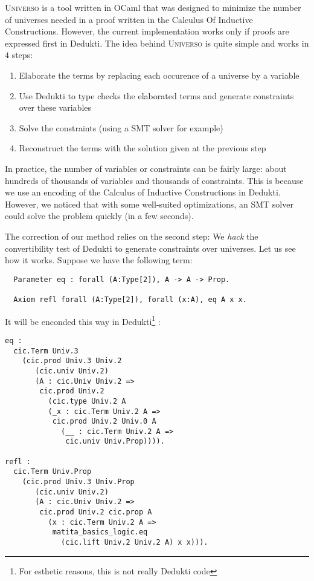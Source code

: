 \documentclass[conference]{IEEEtran}
\newcommand{\universo}{\textsc{Universo}}
\begin{document}
\universo{} is a tool written in OCaml that was designed to minimize the number of universes needed in a proof written in the Calculus Of Inductive Constructions. However, the current implementation works only if proofs are expressed first in Dedukti. The idea behind \universo{} is quite simple and works in \(4\) steps:
\begin{enumerate}
\item Elaborate the terms by replacing each occurence of a universe by a variable
\item Use Dedukti to type checks the elaborated terms and generate constraints over these variables
\item Solve the constraints (using a SMT solver for example)
\item Reconstruct the terms with the solution given at the previous step
\end{enumerate}

In practice, the number of variables or constraints can be fairly large: about hundreds of thousands of variables and thousands of constraints. This is because we use an encoding of the Calculus of Inductive Constructions in Dedukti. However, we noticed that with some well-suited optimizations, an SMT solver could solve the problem quickly (in a few seconds).

The correction of our method relies on the second step: We \textit{hack} the convertibility test of Dedukti to generate constraints over universes. Let us see how it works. Suppose we have the following term:

\begin{verbatim}
  Parameter eq : forall (A:Type[2]), A -> A -> Prop.

  Axiom refl forall (A:Type[2]), forall (x:A), eq A x x.
\end{verbatim}

It will be enconded this way in Dedukti\footnote{For esthetic reasons, this is not really Dedukti code} :

\begin{verbatim}
eq :
  cic.Term Univ.3
    (cic.prod Univ.3 Univ.2
       (cic.univ Univ.2)
       (A : cic.Univ Univ.2 =>
        cic.prod Univ.2
          (cic.type Univ.2 A
          (_x : cic.Term Univ.2 A =>
           cic.prod Univ.2 Univ.0 A
             (__ : cic.Term Univ.2 A =>
              cic.univ Univ.Prop)))).

refl :
  cic.Term Univ.Prop
    (cic.prod Univ.3 Univ.Prop
       (cic.univ Univ.2)
       (A : cic.Univ Univ.2 =>
        cic.prod Univ.2 cic.prop A
          (x : cic.Term Univ.2 A =>
           matita_basics_logic.eq
             (cic.lift Univ.2 Univ.2 A) x x))).
\end{verbatim}
\end{document}
